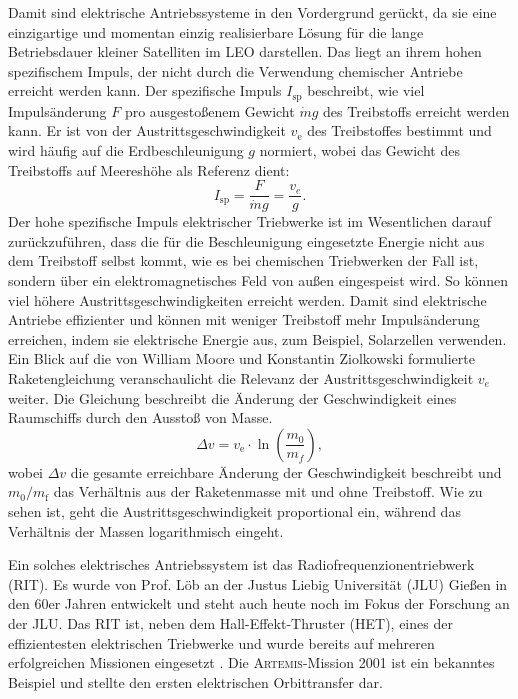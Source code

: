 Damit sind elektrische Antriebssysteme in den Vordergrund gerückt, da sie eine einzigartige und momentan einzig realisierbare Lösung für die lange Betriebsdauer kleiner Satelliten im LEO darstellen. Das liegt an ihrem hohen spezifischem Impuls, der nicht durch die Verwendung chemischer Antriebe erreicht werden kann. Der spezifische Impuls $I_{\text{sp}}$ beschreibt, wie viel Impulsänderung $F$ pro ausgestoßenem Gewicht $\dot mg$ des Treibstoffs erreicht werden kann. Er ist von der Austrittsgeschwindigkeit $v_\text{e}$ des Treibstoffes bestimmt und wird häufig auf die Erdbeschleunigung $g$ normiert, wobei das Gewicht des Treibstoffs auf Meereshöhe als Referenz dient:
\begin{equation}
    I_{\text{sp}} = \frac{F}{\dot{m}g} = \frac{v_e}{g}.
\end{equation} 
Der hohe spezifische Impuls elektrischer Triebwerke ist im Wesentlichen darauf zurückzuführen, dass die für die Beschleunigung eingesetzte Energie nicht aus dem Treibstoff selbst kommt, wie es bei chemischen Triebwerken der Fall ist, sondern über ein elektromagnetisches Feld von außen eingespeist wird. So können viel höhere Austrittsgeschwindigkeiten erreicht werden. Damit sind elektrische Antriebe effizienter und können mit weniger Treibstoff mehr Impulsänderung erreichen, indem sie elektrische Energie aus, zum Beispiel, Solarzellen verwenden. Ein Blick auf die von William Moore und Konstantin Ziolkowski formulierte Raketengleichung veranschaulicht die Relevanz der Austrittsgeschwindigkeit $v_e$ weiter. Die Gleichung beschreibt die Änderung der Geschwindigkeit eines Raumschiffs durch den Ausstoß von Masse.
\begin{equation}
    \Delta v = v_{\text{e}} \cdot \ln\left(\frac{m_0}{m_f}\right),
\end{equation}
wobei $\Delta v$ die gesamte erreichbare Änderung der Geschwindigkeit beschreibt und $m_{\text{0}} / m_{\text{f}}$ das Verhältnis aus der Raketenmasse mit und ohne Treibstoff. Wie zu sehen ist, geht die Austrittsgeschwindigkeit proportional ein, während das Verhältnis der Massen logarithmisch eingeht. 

Ein solches elektrisches Antriebssystem ist das Radiofrequenzionentriebwerk (RIT). Es wurde von Prof. Löb an der Justus Liebig Universität (JLU) Gießen in den 60er Jahren entwickelt und steht auch heute noch im Fokus der Forschung an der JLU. Das RIT ist, neben dem Hall-Effekt-Thruster (HET), eines der effizientesten elektrischen Triebwerke und wurde bereits auf mehreren erfolgreichen Missionen eingesetzt \cite{ion}. Die \textsc{Artemis}-Mission 2001 ist ein bekanntes Beispiel und stellte den ersten elektrischen Orbittransfer dar.

